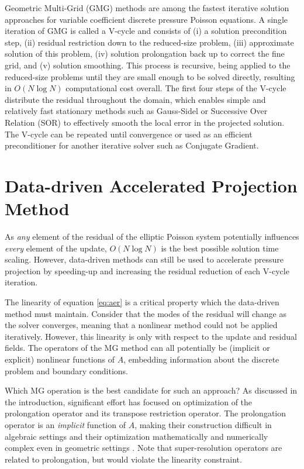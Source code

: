 \documentclass[review]{elsarticle}
\begin{document}
Geometric Multi-Grid (GMG) methods are among the fastest iterative solution approaches for variable coefficient discrete pressure Poisson equations. A single iteration of GMG is called a V-cycle and consists of (i) a solution precondition step, (ii) residual restriction down to the reduced-size problem, (iii) approximate solution of this problem, (iv) solution prolongation back up to correct the fine grid, and (v) solution smoothing. This process is recursive, being applied to the reduced-size problems until they are small enough to be solved directly, resulting in $O(N\log N)$ computational cost overall.
The first four steps of the V-cycle distribute the residual throughout the domain, which enables simple and relatively fast stationary methods such as Gauss-Sidel or Successive Over Relation (SOR) to effectively smooth the local error in the projected solution. The V-cycle can be repeated until convergence or used as an efficient preconditioner for another iterative solver such as Conjugate Gradient. 

\section{Data-driven Accelerated Projection Method}

As \textit{any} element of the residual of the elliptic Poisson system potentially influences \textit{every} element of the update, $O(N\log N)$ is the best possible solution time scaling. However, data-driven methods can still be used to accelerate pressure projection by speeding-up and increasing the residual reduction of each V-cycle iteration.

The linearity of equation \ref{eq:aer} is a critical property which the data-driven method must maintain. Consider that the modes of the residual will change as the solver converges, meaning that a nonlinear method could not be applied iteratively. However, this linearity is only with respect to the update and residual fields. The operators of the MG method can all potentially be (implicit or explicit) nonlinear functions of $A$, embedding information about the discrete problem and boundary conditions. 

Which MG operation is the best candidate for such an approach? As discussed in the introduction, significant effort has focused on optimization of the prolongation operator and its transpose restriction operator. The prolongation operator is an \textit{implicit} function of $A$, making their construction difficult in algebraic settings and their optimization mathematically and numerically complex even in geometric settings \cite{KATRUTSA2020112524,greenfeld2019learning}. Note that super-resolution operators are related to prolongation, but would violate the linearity constraint. 
\end{document}
